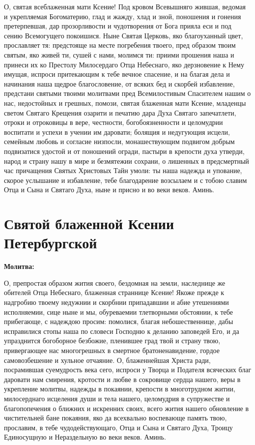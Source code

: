О, святая всеблаженная мати Ксение! Под кровом Всевышняго жившая, ведомая и укрепляемая Богоматерию, глад и жажду, хлад и зной, поношения и гонения претерпевшая, дар прозорливости и чудотворения от Бога прияла еси и под сению Всемогущего покоишися. Ныне Святая Церковь, яко благоуханный цвет, прославляет тя: предстояще на месте погребения твоего, пред образом твоим святым, яко живей ти, сушей с нами, молимся ти: приими прошения наша и принеси их ко Престолу Милосердаго Отца Небеснаго, яко дерзновение к Нему имущая, испроси притекающим к тебе вечное спасение, и на благая дела и начинания наша щедрое благословение, от всяких бед и скорбей избавление, предстани святыми твоими молитвами пред Всемилостивым Спасителем нашим о нас, недостойных и грешных, помози, святая блаженная мати Ксение, младенцы светом Святаго Крещения озарити и печатию дара Духа Святаго запечатлети, отроки и отроковицы в вере, честности, богобоязненности и целомудрии воспитати и успехи в учении им даровати; болящия и недугующия исцели, семейным любовь и согласие низпосли, монашествующим подвигом добрым подвизатися удостой и от поношений огради, пастыри в крепости духа утверди, народ и страну нашу в мире и безмятежии сохрани, о лишенных в предсмертный час причащения Святых Христовых Тайн умоли: ты наша надежда и упование, скорое услышание и избавление, тебе благодарение возсылаем и с тобою славим Отца и Сына и Святаго Духа, ныне и присно и во веки веков. Аминь.

\section{Святой блаженной Ксении Петербургской}
 
\bfseries Молитва:\normalfont{}


О, препростая образом жития своего, бездомная на земли, наследнице же обителей Отца Небеснаго, блаженная страннице Ксение! Якоже прежде к надгробию твоему недужнии и скорбнии припадавшии и абие утешениями исполняемии, сице ныне и мы, обуреваемии тлетворными обстоянии, к тебе прибегающе, с надеждою просим: помолися, благая небошественнице, дабы исправилися стопы наша по словеси Господню к деланию заповедей Его, и да упразднится богоборное безбожие, пленившее град твой и страну твою, привергающее нас многогрешных в смертное братоненавидение, гордое самовозбешение и хульное отчаяние. О, блаженнейшая Христа ради, посрамившая суемудрость века сего, испроси у Творца и Подателя всяческих благ даровати нам смирения, кротости и любве в сокровище сердца нашего, веры в укрепление молитвы, надежды в покаянии, крепости в многотрудном житии, милосерднаго исцеления души и тела нашего, целомудрия в супружестве и благопопечения о ближних и искренних своих, всего жития нашего обновление в чистительней бане покаяния, яко да всехвально воспевающе память твою, прославим, в тебе чудодействующаго, Отца и Сына и Святаго Духа, Троицу Единосущную и Нераздельную во веки веков. Аминь.

